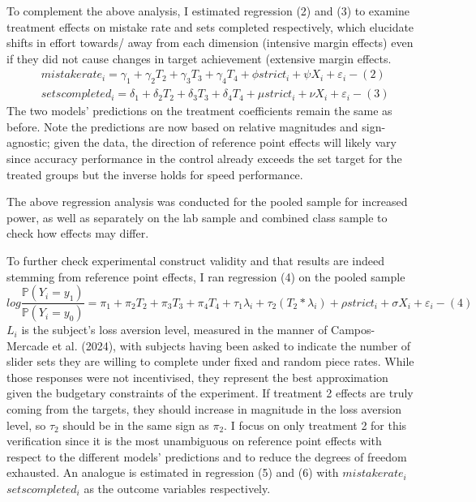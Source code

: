 \documentclass[
  12,
  letterpaper,
  DIV=11,
  numbers=noendperiod]{scrartcl}
\begin{document}
To complement the above analysis, I estimated regression (2) and (3) to
examine treatment effects on mistake rate and sets completed
respectively, which elucidate shifts in effort towards/ away from each
dimension (intensive margin effects) even if they did not cause changes
in target achievement (extensive margin effects. \[
\begin{aligned}
& mistakerate_i = \gamma_1 + \gamma_2 T_2 + \gamma_3 T_3 + \gamma_4 T_4 + \phi strict_i + \psi X_i + \varepsilon_i -(2)
\\
& setscompleted_i = \delta_1 + \delta_2 T_2 + \delta_3 T_3 + \delta_4 T_4 + \mu strict_i + \nu X_i + \varepsilon_i -(3)
\end{aligned}
\] The two models' predictions on the treatment coefficients remain the
same as before. Note the predictions are now based on relative
magnitudes and sign-agnostic; given the data, the direction of reference
point effects will likely vary since accuracy performance in the control
already exceeds the set target for the treated groups but the inverse
holds for speed performance.

The above regression analysis was conducted for the pooled sample for
increased power, as well as separately on the lab sample and combined
class sample to check how effects may differ.

To further check experimental construct validity and that results are
indeed stemming from reference point effects, I ran regression (4) on
the pooled sample \[
log \frac {\mathbb{P}(Y_i = y_1)}{\mathbb{P}(Y_i = y_0)} = \pi_1 + \pi_2 T_2 + \pi_3 T_3 + \pi_4 T_4 + \tau_1 \lambda_i + \tau_2(T_2*\lambda_i) + \rho strict_i + \sigma X_i + \varepsilon_i -(4)
\] \(L_i\) is the subject's loss aversion level, measured in the manner
of Campos-Mercade et al. (2024), with subjects having been asked to
indicate the number of slider sets they are willing to complete under
fixed and random piece rates. While those responses were not
incentivised, they represent the best approximation given the budgetary
constraints of the experiment. If treatment 2 effects are truly coming
from the targets, they should increase in magnitude in the loss aversion
level, so \(\tau_2\) should be in the same sign as \(\pi_2\). I focus on
only treatment 2 for this verification since it is the most unambiguous
on reference point effects with respect to the different models'
predictions and to reduce the degrees of freedom exhausted. An analogue
is estimated in regression (5) and (6) with \(mistakerate_i\)
\(setscompleted_i\) as the outcome variables respectively.
\end{document}
